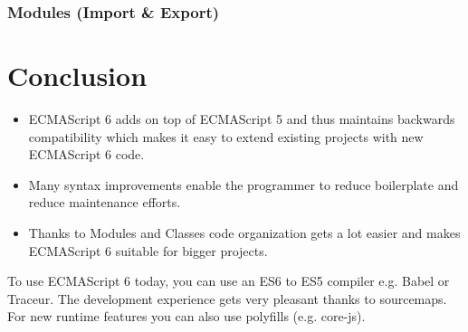 \documentclass{bioinfo}
\begin{document}
\subsubsection{Modules (Import \& Export)}







\section{Conclusion}
\begin{itemize}
        \item ECMAScript 6 adds on top of ECMAScript 5 and thus maintains backwards compatibility which makes it easy to extend existing projects with new ECMAScript 6 code. 
        \item Many syntax improvements enable the programmer to reduce boilerplate and reduce maintenance efforts. 
        \item Thanks to Modules and Classes code organization gets a lot easier and makes ECMAScript 6 suitable for bigger projects.
\end{itemize}
To use ECMAScript 6 today, you can use an ES6 to ES5 compiler e.g. Babel or Traceur. The development experience gets
very pleasant thanks to sourcemaps. For new runtime features you can also use polyfills (e.g. core-js).


%
%
%
%
%
%
%
%
%
\end{document}
